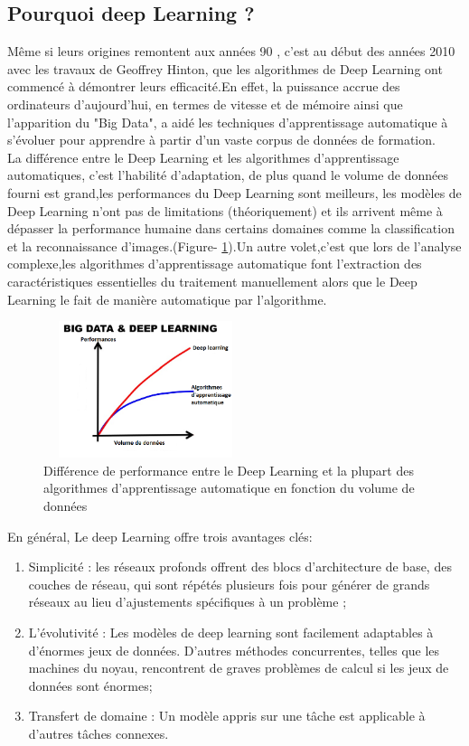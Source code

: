 \subsection{Pourquoi deep Learning ? }

Même si leurs origines remontent aux années 90 , c’est au début des années 2010 avec les travaux de Geoffrey Hinton, que les algorithmes de Deep Learning ont commencé à démontrer leurs efficacité.En effet, la puissance accrue des ordinateurs d’aujourd’hui, en termes de vitesse et de mémoire ainsi que l'apparition du "Big Data", a aidé les techniques d’apprentissage automatique à s’évoluer pour apprendre à partir d’un vaste corpus de données de formation. \\
La différence entre le Deep Learning et les algorithmes d’apprentissage automatiques, c’est l’habilité d’adaptation, de plus quand le volume de données fourni est grand,les performances du Deep Learning sont meilleurs, les modèles de Deep Learning n’ont pas de  limitations (théoriquement) et ils arrivent même à dépasser la performance humaine dans certains domaines comme la classification  et la reconnaissance d’images.(Figure- \ref{fig:vol}).Un autre volet,c'est que lors de l'analyse complexe,les algorithmes d’apprentissage automatique font l'extraction des caractéristiques essentielles du traitement manuellement alors que le Deep Learning le fait de manière automatique par l'algorithme. \cite{47}

\begin{figure}[h]
      \centering
      \includegraphics[width=6cm,height=4cm]{images/cnc.png}
      \caption{Différence de performance entre le Deep Learning et la plupart des algorithmes d'apprentissage automatique en fonction du volume de données}
    \label{fig:vol}
\end{figure}

En général, Le deep Learning offre trois avantages clés:
\begin{enumerate}
    \item Simplicité : les réseaux profonds offrent des blocs d'architecture de base, des couches de réseau, qui sont répétés plusieurs fois pour générer de grands réseaux au lieu d'ajustements spécifiques à un  problème ;
    \item L'évolutivité : Les modèles de deep learning sont facilement adaptables à d'énormes jeux de données. D'autres méthodes concurrentes, telles que les machines du noyau, rencontrent de graves problèmes de calcul si les jeux de données sont énormes;
    \item Transfert de domaine : Un modèle appris sur une tâche est applicable à d'autres tâches connexes.
\end{enumerate}

